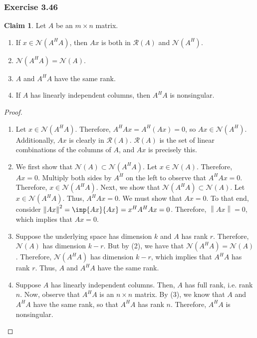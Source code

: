 \documentclass[letterpaper,12pt]{article}
\theoremstyle{definition}
\newtheorem{claim}[theorem]{Claim}
\newcommand{\norm}[1]{\left\lVert#1\right\rVert}
\begin{document}
\subsubsection*{Exercise 3.46}
\begin{claim}
Let $A$ be an $m\times n$ matrix.
\begin{enumerate}
	\item If $x \in \mathscr{N}(A^HA)$, then $Ax$  is both in $\mathscr{R}(A)$ and $\mathscr{N}(A^H)$.
	\item $\mathscr{N}(A^HA) = \mathscr{N}(A)$.
	\item $A$ and $A^HA$ have the same rank.
	\item If $A$ has linearly independent columns, then $A^HA$ is nonsingular. 
\end{enumerate}
\end{claim}
\begin{proof}

\begin{enumerate}
	\item Let $x \in \mathscr{N}(A^HA)$. Therefore, $A^HAx = A^H(Ax) = 0$, so $Ax \in \mathscr{N}(A^H)$. Additionally, $Ax$ is clearly in $\mathscr{R}(A)$. $\mathscr{R}(A)$ is the set of linear combinations of the columns of $A$, and $Ax$ is precisely this.
	\item We first show that $\mathscr{N}(A) \subset \mathscr{N}(A^HA)$. Let $x \in \mathscr{N}(A)$. Therefore, $Ax = 0$. Multiply both sides by $A^H$ on the left to observe that $A^HA x = 0$. Therefore, $x \in  \mathscr{N}(A^HA)$. Next, we show that $\mathscr{N}(A^HA) \subset \mathscr{N}(A)$. Let $x \in  \mathscr{N}(A^HA)$. Thus, $A^HAx = 0$. We must show that $Ax =0$. To that end, consider $\norm{Ax}^2 = \inp{Ax}{Ax} = x^HA^HAx = 0$. Therefore, $\norm{Ax} =0$, which implies that $Ax=0$.
	\item Suppose the underlying space has dimension $k$ and $A$ has rank $r$. Therefore, $\mathscr{N}(A)$ has dimension $k-r$. But by (2), we have that $\mathscr{N}(A^HA) = \mathscr{N}(A)$. Therefore, $\mathscr{N}(A^HA)$ has dimension $k-r$, which implies that $A^HA$ has rank $r$. Thus, $A$ and $A^HA$ have the same rank.
	\item Suppose $A$ has linearly independent columns. Then, $A$ has full rank, i.e. rank $n$. Now, observe that $A^HA$ is an $n \times n$ matrix. By (3), we know that $A$ and $A^HA$ have the same rank, so that $A^HA$ has rank $n$. Therefore, $A^HA$ is nonsingular. 
\end{enumerate}
\end{proof}
\end{document}
